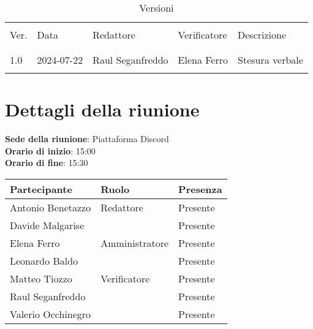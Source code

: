 \documentclass[italian,12pt]{article}
\begin{document}
\newcommand{\mySkip}[1][]{#1}



\newpage



\begin{table}[!h]
	\caption{Versioni}
	\footnotesize
	\begin{center}
		\begin{tabular}{ l l l l p{6cm} }
			\hline                                                                       \\[-2ex]
			Ver. & Data       & Redattore         & Verificatore       & Descrizione     \\
			\\[-2ex] \hline \\[-1.5ex]
			1.0  & 2024-07-22 & Raul Seganfreddo  & Elena Ferro        & Stesura verbale \\
			\\[-1.5ex] \hline
		\end{tabular}
	\end{center}
\end{table}

\newpage

\tableofcontents

\newpage

\section{Dettagli della riunione}

\textbf{Sede della riunione}: Piattaforma Discord\\
\textbf{Orario di inizio}: 15:00\\
\textbf{Orario di fine}: 15:30\\

\begin{flushleft}
	\begin{table}[!h]
		\begin{tabular}{ |l|l|l| }
			\hline
			\textbf{Partecipante} & \textbf{Ruolo} & \textbf{Presenza} \\
			\hline
			Antonio Benetazzo     & Redattore      & Presente          \\
			Davide Malgarise      &                & Presente          \\
			Elena Ferro           & Amministratore & Presente          \\
			Leonardo Baldo        &                & Presente          \\
			Matteo Tiozzo         & Verificatore   & Presente          \\
			Raul Seganfreddo      &                & Presente          \\
			Valerio Occhinegro    &                & Presente          \\
			\hline
		\end{tabular}
	\end{table}
\end{flushleft}
\end{document}
